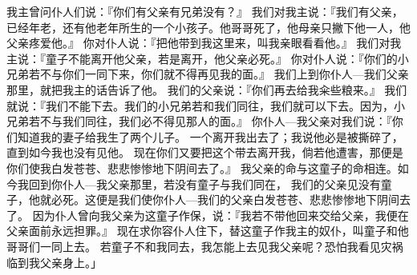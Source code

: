 {我主曾问仆人们说：『你们有父亲有兄弟没有？』
我们对我主说：『我们有父亲，已经年老，还有他老年所生的一个小孩子。他哥哥死了，他母亲只撇下他一人，他父亲疼爱他。』
你对仆人说：『把他带到我这里来，叫我亲眼看看他。』
我们对我主说：『童子不能离开他父亲，若是离开，他父亲必死。』
你对仆人说：『你们的小兄弟若不与你们一同下来，你们就不得再见我的面。』
我们上到你仆人—我们父亲那里，就把我主的话告诉了他。
我们的父亲说：『你们再去给我籴些粮来。』
我们就说：『我们不能下去。我们的小兄弟若和我们同往，我们就可以下去。因为，小兄弟若不与我们同往，我们必不得见那人的面。』
你仆人—我父亲对我们说：『你们知道我的妻子给我生了两个儿子。
一个离开我出去了；我说他必是被撕碎了，直到如今我也没有见他。
现在你们又要把这个带去离开我，倘若他遭害，那便是你们使我白发苍苍、悲悲惨惨地下阴间去了。』
我父亲的命与这童子的命相连。如今我回到你仆人—我父亲那里，若没有童子与我们同在，
我们的父亲见没有童子，他就必死。这便是我们使你仆人—我们的父亲白发苍苍、悲悲惨惨地下阴间去了。
因为仆人曾向我父亲为这童子作保，说：『我若不带他回来交给父亲，我便在父亲面前永远担罪。』
现在求你容仆人住下，替这童子作我主的奴仆，叫童子和他哥哥们一同上去。
若童子不和我同去，我怎能上去见我父亲呢？恐怕我看见灾祸临到我父亲身上。」

}
